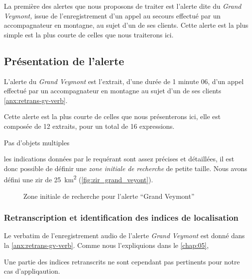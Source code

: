 La première des alertes que nous proposons de traiter est l'alerte
dite du \emph{Grand Veymont,} issue de l'enregistrement d'un appel au
secours effectué par un accompagnateur en montagne, au sujet d'un de
ses clients.
%
Cette alerte est la plus simple est la plus courte de celles que nous
traiterons ici.

\subsection{Présentation de l'alerte}
\label{subsec:9-2-1}

L'alerte du \emph{Grand Veymont} est l'extrait, d'une durée de 1
minute 06, d'un appel effectué par un accompagnateur en montagne au
sujet d'un de ses clients \autoref{anx:retrans-gv-verb}.


Cette alerte est la plus courte de celles que nous présenterons ici,
elle est composée de 12 extraits, pour un total de 16 expressions.



Pas d'objets multiples

les indications données par le requérant sont assez précises et
détaillées, il est donc possible de définir une \emph{zone initiale de
  recherche} de petite taille. Nous avons défini une \ac{zir} de
\SI{25}{\kilo\meter\squared} (\autoref{fig:zir_grand_veyont}).

\begin{figure}
  \centering
  
  \caption{Zone initiale de recherche pour l'alerte \enquote{Grand Veymont}}
  \label{fig:zir_grand_veyont}
\end{figure}


\subsubsection{Retranscription et identification des indices de localisation}
\label{subsec:9-2-1-1}


Le verbatim de l'enregistrement audio de l'alerte \emph{Grand Veymont}
est donné dans la \autoref{anx:retrans-gv-verb}.
%
Comme nous l’expliquions dans le \autoref{chap:05}, 


Une partie des indices retranscrits ne sont cependant pas pertinents
pour notre cas d'appliqaution.




